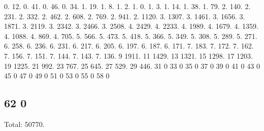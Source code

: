 0. 12. 0. 41. 0. 46. 0. 34. 1. 19. 1. 8. 1. 2. 1. 0. 1. 3. 1. 14. 1. 38. 1. 79. 2. 140. 2. 231. 2. 332. 2. 462. 2. 608. 2. 769. 2. 941. 2. 1120. 3. 1307. 3. 1461. 3. 1656. 3. 1871. 3. 2119. 3. 2342. 3. 2466. 3. 2508. 4. 2429. 4. 2233. 4. 1989. 4. 1679. 4. 1359. 4. 1088. 4. 869. 4. 705. 5. 566. 5. 473. 5. 418. 5. 366. 5. 349. 5. 308. 5. 289. 5. 271. 6. 258. 6. 236. 6. 231. 6. 217. 6. 205. 6. 197. 6. 187. 6. 171. 7. 183. 7. 172. 7. 162. 7. 156. 7. 151. 7. 144. 7. 143. 7. 136. 9 1911. 11 1429. 13 1321. 15 1298. 17 1203. 19 1225. 21 992. 23 767. 25 645. 27 529. 29 446. 31 0 33 0 35 0 37 0 39 0 41 0 43 0 45 0 47 0 49 0 51 0 53 0 55 0 58 0 \subsection*{62 0 }

Total\+: 50770. 